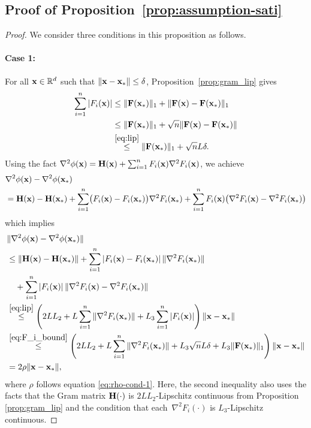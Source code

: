 \documentclass[11pt]{article}
\theoremstyle{plain}
\theoremstyle{definition}
\theoremstyle{remark}
\theoremstyle{plain}
\def\vx{{\bf{x}}}
\def\BR{{\mathbb{R}}}
\def\vx {{{\bf x}}}
\def\BR{{\mathbb{R}}}
\def\F{{\bf F}}
\def\H{{\bf H}}
\def\x{{\bf x}}
\begin{document}
\subsection{Proof of Proposition~\ref{prop:assumption-sati}}
\label{app:proof_prop}
\begin{proof}
We consider three conditions in this proposition as follows.
\paragraph{Case 1:}
 For all $\vx\in\BR^d$ such that $\|\x-\x_*\|\leq\delta$,  Proposition~\ref{prop:gram_lip} gives
\begin{align}
    \label{eq:F_i_bound}
    \begin{split}
\sum_{i=1}^n|F_i(\x)|
&\leq\|\F(\x_*)\|_1+\|\F(\x)-\F(\x_*)\|_1\\
&\leq\|\F(\x_*)\|_1+\sqrt n\|\F(\x)-\F(\x_*)\|\\
&\overset{\eqref{eq:lip}}{\leq}\|\F(\x_*)\|_1+\sqrt nL\delta.
    \end{split}
\end{align}
Using the fact $\nabla^2\phi(\x)=\H(\x)+\sum_{i=1}^nF_i(\x)\nabla^2F_i(\x)$, we achieve
\begin{align*}
&\nabla^2\phi(\x)-\nabla^2\phi(\x_*)\\
&=\H(\x)-\H(\x_*)
+\sum_{i=1}^n\bigl(F_i(\x)-F_i(\x_*)\bigr)\nabla^2F_i(\x_*)+\sum_{i=1}^nF_i(\x)
\bigl(\nabla^2F_i(\x)-\nabla^2F_i(\x_*)\bigr)
\end{align*}
which implies
\begin{align}
\label{eq:nabla_2phi_bound}
\begin{split}    
&\|\nabla^2\phi(\x)-\nabla^2\phi(\x_*)\|\\
&\leq\|\H(\x)-\H(\x_*)\|
+\sum_{i=1}^n|F_i(\x)-F_i(\x_*)|\,\|\nabla^2F_i(\x_*)\| \\
&\quad+\sum_{i=1}^n|F_i(\x)|\,
\|\nabla^2F_i(\x)-\nabla^2F_i(\x_*)\|\\
&\overset{\eqref{eq:lip}}{\leq}\left(2LL_2+L\sum_{i=1}^n\|\nabla^2F_i(\x_*)\|
+L_3\sum_{i=1}^n|F_i(\x)|\right)\|\x-\x_*\|\\
&\overset{\eqref{eq:F_i_bound}}{\leq}\left(2LL_2+L\sum_{i=1}^n\|\nabla^2F_i(\x_*)\|
+L_3\sqrt nL\delta+L_3\|\F(\x_*)\|_1\right)\|\x-\x_*\|\\
&=2\rho\|\x-\x_*\|,
\end{split}
\end{align}
where $\rho$ follows equation \eqref{eq:rho-cond-1}.
Here, the second inequality also uses the facts that the Gram matrix $\H(\cdot)$ is $2LL_2$-Lipschitz continuous from Proposition \ref{prop:gram_lip} and the condition that each~$\nabla^2F_i(\cdot)$ is $L_3$-Lipschitz continuous. 

\end{proof}
\end{document}
